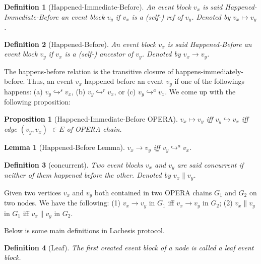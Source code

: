\documentclass{article}
\newtheorem{lem}[thm]{Lemma}
\newtheorem{prop}[thm]{Proposition}
\newtheorem{defn}{Definition}[section]
\newcommand{\eself}{\hookrightarrow^{s}}
\newcommand{\eref}{\hookrightarrow^{r}}
\newcommand{\eancestor}{\hookrightarrow^{a}}
\newcommand{\erefz}{\hookrightarrow}
\newcommand{\hibefore}{\mapsto}
\newcommand{\hbefore}{\rightarrow}
\newcommand{\concur}{\parallel}
\begin{document}
\begin{defn}[Happened-Immediate-Before]
An event block $v_x$ is said Happened-Immediate-Before an event block $v_y$ if $v_x$ is a (self-) ref of $v_y$. Denoted by $v_x \hibefore v_y$.
\end{defn}

\begin{defn}[Happened-Before]	
	 An event block $v_x$ is said Happened-Before an event block $v_y$ if $v_x$ is a (self-) ancestor of $v_y$. Denoted by $v_x \hbefore v_y$.
\end{defn}

The happens-before relation is the transitive closure of happens-immediately-before.
Thus, an event $v_x$ happened before an event $v_y$ if one of the followings happens: (a) $v_y \eself v_x$, (b) $v_y \eref v_x$,  or (c) $v_y \eancestor v_x$.
 We come up with the following proposition:
\begin{prop}[Happened-Immediate-Before OPERA]
$v_x \hibefore v_y$ iff $v_y \erefz v_x$ iff edge $(v_y, v_x)$ $\in E$ of OPERA chain.
\end{prop}
\begin{lem}[Happened-Before Lemma]
	$v_x \hbefore v_y$ iff $v_y \eancestor v_x$.
\end{lem}





\begin{defn}[concurrent]
	Two event blocks $v_x$ and $v_y$ are said concurrent if neither of them  happened before the other. Denoted by $v_x \concur v_y$.
\end{defn}


Given two vertices $v_x$ and $v_y$ both contained in two OPERA chains $G_1$ and $G_2$ on two nodes. We have the following: 
	(1) $v_x \hbefore v_y$ in $G_1$ iff $v_x \hbefore v_y$ in $G_2$; (2)
	$v_x \concur v_y$ in $G_1$ iff $v_x \concur v_y$ in $G_2$.


Below is some main definitions in Lachesis protocol.
\begin{defn}[Leaf]
	The first created event block of a node is called a leaf event block.
\end{defn}
\end{document}
